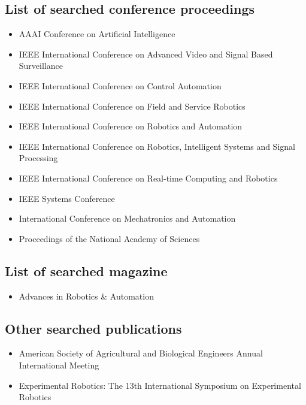     \subsection{List of searched conference proceedings}
    \begin{itemize}
        \item AAAI Conference on Artificial Intelligence 
        \item IEEE International Conference on Advanced Video and Signal Based Surveillance
        \item IEEE International Conference on Control Automation 
        \item IEEE International Conference on Field and Service Robotics
        \item IEEE International Conference on Robotics and Automation
        \item IEEE International Conference on Robotics, Intelligent Systems and Signal Processing
        \item IEEE International Conference on Real-time Computing and Robotics
        \item IEEE Systems Conference
        \item International Conference on Mechatronics and Automation
        \item Proceedings of the National Academy of Sciences
    \end{itemize}
    \subsection{List of searched magazine}
    \begin{itemize}
        \item Advances in Robotics {\&} Automation
    \end{itemize}
    \subsection{Other searched publications}
    \begin{itemize}
        \item American Society of Agricultural and Biological Engineers Annual International Meeting
        \item Experimental Robotics: The 13th International Symposium on Experimental Robotics
    \end{itemize}
